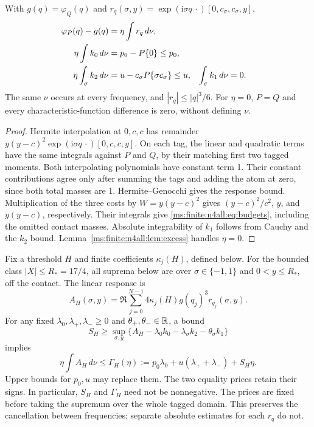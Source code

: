 \begin{lemma}\label{ms:finite:n4all:lem:common-measure}
With $g(q)=\varphi_Q(q)$ and
$r_q(\sigma,y)=\exp(\mathrm i\sigma q\,\cdot)[0,c_\sigma,c_\sigma,y]$,
\begin{align}
 \varphi_P(q)-g(q)&=\eta\int r_q\,d\nu,\notag\\
 \eta\int k_0\,d\nu&=p_0-P\{0\}\le p_0,\notag\\
 \eta\int_{\sigma}k_2\,d\nu&=u-c_\sigma P\{\sigma c_\sigma\}\le u,
 &\int_{\sigma}k_1\,d\nu&=0.\label{ms:finite:n4all:eq:budgets}
\end{align}
The same $\nu$ occurs at every frequency, and $|r_q|\le |q|^3/6$.
For $\eta=0$, $P=Q$ and every characteristic-function difference is
zero, without defining $\nu$.
\end{lemma}
\begin{proof}
Hermite interpolation at $0,c,c$ has remainder
$y(y-c)^2\exp(\mathrm i\sigma q\,\cdot)[0,c,c,y]$.
On each tag, the linear and quadratic terms have the same integrals
against $P$ and $Q$, by their matching first two tagged moments.
Both interpolating polynomials have constant term 1. Their constant
contributions agree only after summing the tags and adding the atom
at zero, since both total masses are 1.
Hermite--Genocchi gives the response bound. Multiplication of the
three costs by $W=y(y-c)^2$ gives
$(y-c)^2/c^2$, $y$, and $y(y-c)$, respectively.
Their integrals give \eqref{ms:finite:n4all:eq:budgets}, including the omitted
contact masses. Absolute integrability of $k_1$ follows from Cauchy
and the $k_2$ bound. Lemma~\ref{ms:finite:n4all:lem:excess} handles $\eta=0$.
\end{proof}

Fix a threshold $H$ and finite coefficients $\kappa_j(H)$, defined
below. For the bounded class $|X|\le R_*=17/4$, all suprema below
are over $\sigma\in\{-1,1\}$ and $0<y\le R_*$, off the contact.
The linear response is
\[
 A_H(\sigma,y)=\Re\sum_{j=0}^{N-1}
        4\kappa_j(H)g(q_j)^3r_{q_j}(\sigma,y).
\]
For any fixed $\lambda_0,\lambda_+,\lambda_-\ge0$ and
$\theta_+,\theta_-\in\mathbb R$, a bound
\begin{equation}\label{ms:finite:n4all:eq:priced-supremum}
 S_H\ge\sup_{\sigma,y}
 \{A_H-\lambda_0k_0-\lambda_\sigma k_2-\theta_\sigma k_1\}
\end{equation}
implies
\begin{equation}\label{ms:finite:n4all:eq:gamma}
 \eta\int A_H\,d\nu\le
 \Gamma_H(\eta):=p_0\lambda_0+u(\lambda_++\lambda_-)+S_H\eta.
\end{equation}
Upper bounds for $p_0,u$ may replace them. The two equality prices
retain their signs. In particular, $S_H$ and $\Gamma_H$ need not be
nonnegative. The prices are fixed before taking the supremum over
the whole tagged domain. This preserves the cancellation between
frequencies; separate absolute estimates for each $r_q$ do not.


